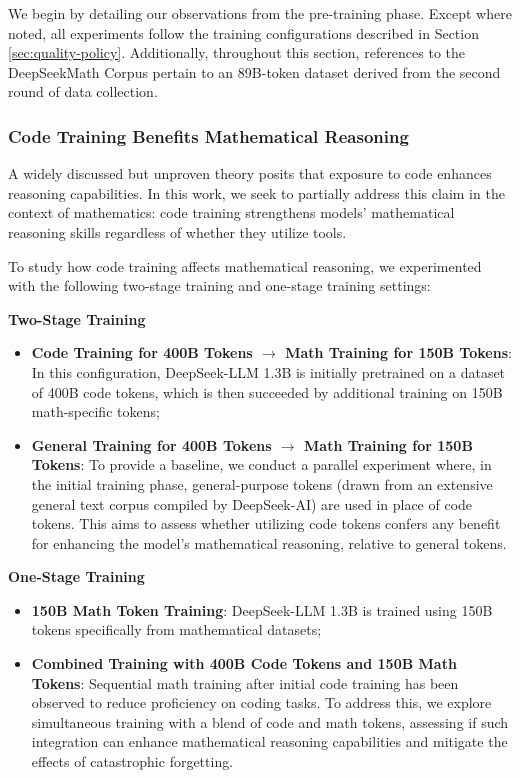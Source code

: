 \begin{itemize}[topsep=0pt]
\begin{itemize}[topsep=0pt]
We begin by detailing our observations from the pre-training phase. Except where noted, all experiments follow the training configurations described in Section \ref{sec:quality-policy}. Additionally, throughout this section, references to the DeepSeekMath Corpus pertain to an 89B-token dataset derived from the second round of data collection.

\subsubsection{Code Training Benefits Mathematical Reasoning}

A widely discussed but unproven theory posits that exposure to code enhances reasoning capabilities. In this work, we seek to partially address this claim in the context of mathematics: code training strengthens models' mathematical reasoning skills regardless of whether they utilize tools.

To study how code training affects mathematical reasoning, we experimented with the following two-stage training and one-stage training settings:

\textbf{Two-Stage Training}

\begin{itemize}[topsep=0pt]
    \item \textbf{Code Training for 400B Tokens $\rightarrow$ Math Training for 150B Tokens}: In this configuration, DeepSeek-LLM 1.3B is initially pretrained on a dataset of 400B code tokens, which is then succeeded by additional training on 150B math-specific tokens;
    \item \textbf{General Training for 400B Tokens $\rightarrow$ Math Training for 150B Tokens}: To provide a baseline, we conduct a parallel experiment where, in the initial training phase, general-purpose tokens (drawn from an extensive general text corpus compiled by DeepSeek-AI) are used in place of code tokens. This aims to assess whether utilizing code tokens confers any benefit for enhancing the model's mathematical reasoning, relative to general tokens.
\end{itemize}

\textbf{One-Stage Training}

\begin{itemize}[topsep=0pt]
    \item \textbf{150B Math Token Training}: DeepSeek-LLM 1.3B is trained using 150B tokens specifically from mathematical datasets;
    \item \textbf{Combined Training with 400B Code Tokens and 150B Math Tokens}: Sequential math training after initial code training has been observed to reduce proficiency on coding tasks. To address this, we explore simultaneous training with a blend of code and math tokens, assessing if such integration can enhance mathematical reasoning capabilities and mitigate the effects of catastrophic forgetting.
\end{itemize}


\end{itemize}
\end{itemize}
